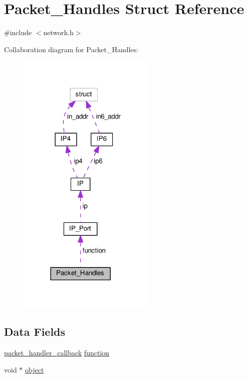 \hypertarget{struct_packet___handles}{\section{Packet\+\_\+\+Handles Struct Reference}
\label{struct_packet___handles}
}


{\ttfamily \#include $<$network.\+h$>$}



Collaboration diagram for Packet\+\_\+\+Handles\+:
\nopagebreak
\begin{figure}[H]
\begin{center}
\leavevmode
\includegraphics[width=185pt]{d4/d19/struct_packet___handles__coll__graph}
\end{center}
\end{figure}
\subsection*{Data Fields}
\begin{DoxyCompactItemize}
\item 
\hyperlink{network_8h_a01fb3f0e3fd19ed8eefe335b64934156}{packet\+\_\+handler\+\_\+callback} \hyperlink{struct_packet___handles_a197979c60c06b39ac717b08f5091dd0e}{function}
\item 
void $\ast$ \hyperlink{struct_packet___handles_a077376d12464f945e2414d5499c79b3f}{object}
\end{DoxyCompactItemize}


